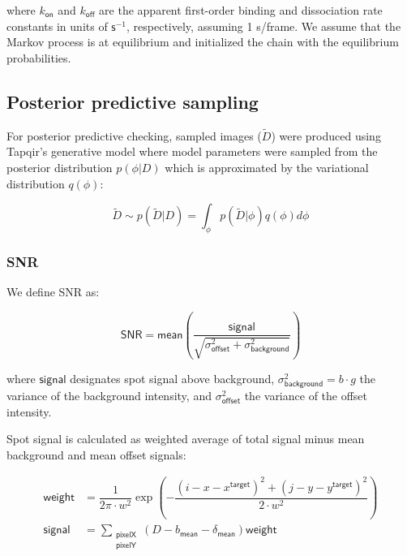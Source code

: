 \noindent
where $k_{\mathsf{on}}$ and $k_{\mathsf{off}}$ are the apparent first-order binding and dissociation rate constants in units of $\mathsf{s}^{-1}$, respectively, assuming 1 s/frame. We assume that the Markov process is at equilibrium and initialized the chain with the equilibrium probabilities.

\subsection*{Posterior predictive sampling}

For posterior predictive checking, sampled images ($\widetilde{D}$) were produced using Tapqir's generative model where model parameters were sampled from the posterior distribution $p(\phi|D)$ which is approximated by the variational distribution $q(\phi)$:

\begin{equation}
    \widetilde{D} \sim p(\widetilde{D} | D) = \int_\phi p(\widetilde{D} | \phi) q(\phi) d\phi
\end{equation}

\subsubsection*{SNR}

We define SNR as:

\begin{equation}
    \mathsf{SNR} = \mathsf{mean} \left( \dfrac{\mathsf{signal}}{\sqrt{\sigma^2_{\mathsf{offset}} + \sigma^2_{\mathsf{background}}}} \right)
\end{equation}

where $\mathsf{signal}$ designates spot signal above background, $\sigma^2_{\mathsf{background}} = b \cdot g$ the variance of the background intensity, and $\sigma^2_{\mathsf{offset}}$ the variance of the offset intensity.

Spot signal is calculated as weighted average of total signal minus mean background and mean offset signals:

\begin{subequations}
\begin{align}
    \mathsf{weight} &= \dfrac{1}{2 \pi \cdot w^2} \exp{\left( -\dfrac{(i-x-x^\mathsf{target})^2 + (j-y-y^\mathsf{target})^2}{2 \cdot w^2} \right)} \\
    \mathsf{signal} &=  \sum_{\substack{\mathsf{pixelX} \\ \mathsf{pixelY}}} \left( D - b_{\mathsf{mean}} - \delta_\mathsf{mean} \right)  \mathsf{weight}
\end{align}
\end{subequations}

